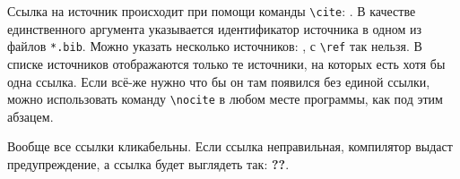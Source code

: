 Ссылка на источник происходит при помощи команды \verb|\cite|: \cite{duportail:alu}. В качестве единственного аргумента указывается идентификатор источника в одном из файлов \verb|*.bib|. Можно указать несколько источников: \cite{duportail:alu, husserl:pd, althusser:iia}, с \verb|\ref| так нельзя. В списке источников отображаются только те источники, на которых есть хотя бы одна ссылка. Если всё-же нужно что бы он там появился без единой ссылки, можно использовать команду \verb|\nocite| в любом месте программы, как под этим абзацем.

Вообще все ссылки кликабельны. Если ссылка неправильная, компилятор выдаст предупреждение, а ссылка будет выглядеть так: \textbf{??}.

\nocite{duportail:alu}
\nocite{althusser:iia}
\nocite{husserl:pd}
\nocite{husserl:sbe}
